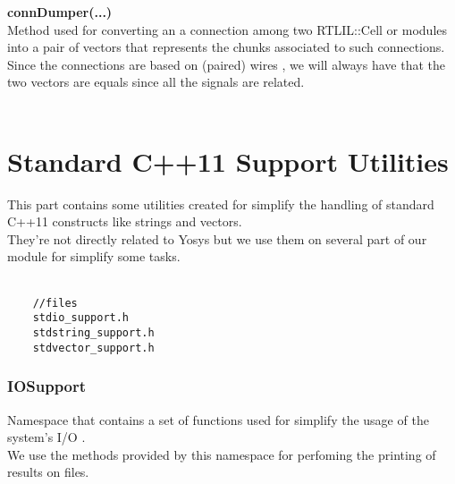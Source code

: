 \documentclass{article}
\newcommand{\sectionbreak}{\clearpage}
\begin{document}
 \textbf{connDumper(...)}\\
 Method used for converting an a connection among two RTLIL::Cell or modules into a pair of vectors that represents 
 the chunks associated to such connections.\\
 Since the connections are based on (paired) wires , we will always have that the two vectors are equals since all
 the signals are related.\\\\
 
  \sectionbreak{\clearpage}
 
 
 \part{Standard C++11 Support Utilities}
 
This part contains some utilities created for simplify the handling of standard C++11 constructs like strings and vectors.\\
They're not directly related to Yosys but we use them on several part of our module for simplify some tasks.\\\\ 
 
 \begin{mdframed}[hidealllines=true, backgroundcolor=cyan!10]
 	\begin{lstlisting}
 	//files
 	stdio_support.h
 	stdstring_support.h
 	stdvector_support.h
 	\end{lstlisting}
 \end{mdframed}
 
 
 \sectionbreak{\clearpage}
 
 
 \section{IOSupport}
 
 Namespace that contains a set of functions used for simplify the usage of the system's I/O .\\
 We use the methods provided by this namespace for perfoming the printing of results on files.\\
 
\end{document}

